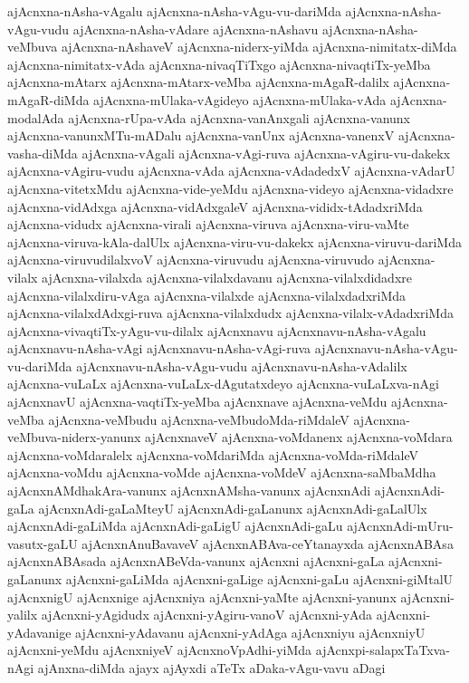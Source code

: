 {ajAcnxna-nAsha-vAgalu
ajAcnxna-nAsha-vAgu-vu-dariMda
ajAcnxna-nAsha-vAgu-vudu
ajAcnxna-nAsha-vAdare
ajAcnxna-nAshavu
ajAcnxna-nAsha-veMbuva
ajAcnxna-nAshaveV
ajAcnxna-niderx-yiMda
ajAcnxna-nimitatx-diMda
ajAcnxna-nimitatx-vAda
ajAcnxna-nivaqTiTxgo
ajAcnxna-nivaqtiTx-yeMba
ajAcnxna-mAtarx
ajAcnxna-mAtarx-veMba
ajAcnxna-mAgaR-dalilx
ajAcnxna-mAgaR-diMda
ajAcnxna-mUlaka-vAgideyo
ajAcnxna-mUlaka-vAda
ajAcnxna-modalAda
ajAcnxna-rUpa-vAda
ajAcnxna-vanAnxgali
ajAcnxna-vanunx
ajAcnxna-vanunxMTu-mADalu
ajAcnxna-vanUnx
ajAcnxna-vanenxV
ajAcnxna-vasha-diMda
ajAcnxna-vAgali
ajAcnxna-vAgi-ruva
ajAcnxna-vAgiru-vu-dakekx
ajAcnxna-vAgiru-vudu
ajAcnxna-vAda
ajAcnxna-vAdadedxV
ajAcnxna-vAdarU
ajAcnxna-vitetxMdu
ajAcnxna-vide-yeMdu
ajAcnxna-videyo
ajAcnxna-vidadxre
ajAcnxna-vidAdxga
ajAcnxna-vidAdxgaleV
ajAcnxna-vididx-tAdadxriMda
ajAcnxna-vidudx
ajAcnxna-virali
ajAcnxna-viruva
ajAcnxna-viru-vaMte
ajAcnxna-viruva-kAla-dalUlx
ajAcnxna-viru-vu-dakekx
ajAcnxna-viruvu-dariMda
ajAcnxna-viruvudilalxvoV
ajAcnxna-viruvudu
ajAcnxna-viruvudo
ajAcnxna-vilalx
ajAcnxna-vilalxda
ajAcnxna-vilalxdavanu
ajAcnxna-vilalxdidadxre
ajAcnxna-vilalxdiru-vAga
ajAcnxna-vilalxde
ajAcnxna-vilalxdadxriMda
ajAcnxna-vilalxdAdxgi-ruva
ajAcnxna-vilalxdudx
ajAcnxna-vilalx-vAdadxriMda
ajAcnxna-vivaqtiTx-yAgu-vu-dilalx
ajAcnxnavu
ajAcnxnavu-nAsha-vAgalu
ajAcnxnavu-nAsha-vAgi
ajAcnxnavu-nAsha-vAgi-ruva
ajAcnxnavu-nAsha-vAgu-vu-dariMda
ajAcnxnavu-nAsha-vAgu-vudu
ajAcnxnavu-nAsha-vAdalilx
ajAcnxna-vuLaLx
ajAcnxna-vuLaLx-dAgutatxdeyo
ajAcnxna-vuLaLxva-nAgi
ajAcnxnavU
ajAcnxna-vaqtiTx-yeMba
ajAcnxnave
ajAcnxna-veMdu
ajAcnxna-veMba
ajAcnxna-veMbudu
ajAcnxna-veMbudoMda-riMdaleV
ajAcnxna-veMbuva-niderx-yanunx
ajAcnxnaveV
ajAcnxna-voMdanenx
ajAcnxna-voMdara
ajAcnxna-voMdaralelx
ajAcnxna-voMdariMda
ajAcnxna-voMda-riMdaleV
ajAcnxna-voMdu
ajAcnxna-voMde
ajAcnxna-voMdeV
ajAcnxna-saMbaMdha
ajAcnxnAMdhakAra-vanunx
ajAcnxnAMsha-vanunx
ajAcnxnAdi
ajAcnxnAdi-gaLa
ajAcnxnAdi-gaLaMteyU
ajAcnxnAdi-gaLanunx
ajAcnxnAdi-gaLalUlx
ajAcnxnAdi-gaLiMda
ajAcnxnAdi-gaLigU
ajAcnxnAdi-gaLu
ajAcnxnAdi-mUru-vasutx-gaLU
ajAcnxnAnuBavaveV
ajAcnxnABAva-ceYtanayxda
ajAcnxnABAsa
ajAcnxnABAsada
ajAcnxnABeVda-vanunx
ajAcnxni
ajAcnxni-gaLa
ajAcnxni-gaLanunx
ajAcnxni-gaLiMda
ajAcnxni-gaLige
ajAcnxni-gaLu
ajAcnxni-giMtalU
ajAcnxnigU
ajAcnxnige
ajAcnxniya
ajAcnxni-yaMte
ajAcnxni-yanunx
ajAcnxni-yalilx
ajAcnxni-yAgidudx
ajAcnxni-yAgiru-vanoV
ajAcnxni-yAda
ajAcnxni-yAdavanige
ajAcnxni-yAdavanu
ajAcnxni-yAdAga
ajAcnxniyu
ajAcnxniyU
ajAcnxni-yeMdu
ajAcnxniyeV
ajAcnxnoVpAdhi-yiMda
ajAcnxpi-salapxTaTxva-nAgi
ajAnxna-diMda
ajayx
ajAyxdi
aTeTx
aDaka-vAgu-vavu
aDagi
}
